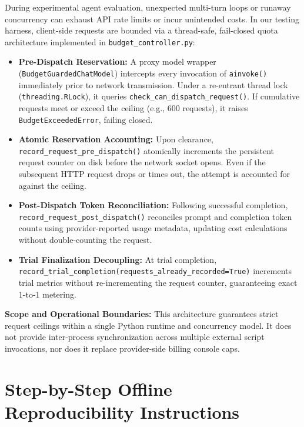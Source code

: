 \documentclass[11pt,a4paper]{article}
\begin{document}
During experimental agent evaluation, unexpected multi-turn loops or runaway concurrency can exhaust API rate limits or incur unintended costs. In our testing harness, client-side requests are bounded via a thread-safe, fail-closed quota architecture implemented in \texttt{budget\_controller.py}:
\begin{itemize}
    \item \textbf{Pre-Dispatch Reservation:} A proxy model wrapper (\texttt{BudgetGuardedChatModel}) intercepts every invocation of \texttt{ainvoke()} immediately prior to network transmission. Under a re-entrant thread lock (\texttt{threading.RLock}), it queries \texttt{check\_can\_dispatch\_request()}. If cumulative requests meet or exceed the ceiling (e.g., 600 requests), it raises \texttt{BudgetExceededError}, failing closed.
    \item \textbf{Atomic Reservation Accounting:} Upon clearance, \texttt{record\_request\_pre\_dispatch()} atomically increments the persistent request counter on disk before the network socket opens. Even if the subsequent HTTP request drops or times out, the attempt is accounted for against the ceiling.
    \item \textbf{Post-Dispatch Token Reconciliation:} Following successful completion, \texttt{record\_request\_post\_dispatch()} reconciles prompt and completion token counts using provider-reported usage metadata, updating cost calculations without double-counting the request.
    \item \textbf{Trial Finalization Decoupling:} At trial completion, \texttt{record\_trial\_completion(requests\_already\_recorded=True)} increments trial metrics without re-incrementing the request counter, guaranteeing exact 1-to-1 metering.
\end{itemize}
\textbf{Scope and Operational Boundaries:} This architecture guarantees strict request ceilings within a single Python runtime and concurrency model. It does not provide inter-process synchronization across multiple external script invocations, nor does it replace provider-side billing console caps.

\clearpage
\section{Step-by-Step Offline Reproducibility Instructions}
\label{app:reproduce}
\end{document}
